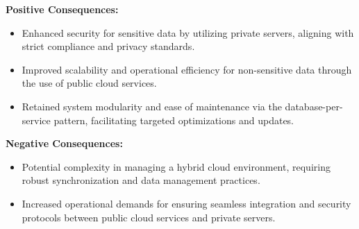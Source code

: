 \textbf{Positive Consequences:}
\begin{itemize}
    \item Enhanced security for sensitive data by utilizing private servers, aligning with strict compliance and privacy standards.
    \item Improved scalability and operational efficiency for non-sensitive data through the use of public cloud services.
    \item Retained system modularity and ease of maintenance via the database-per-service pattern, facilitating targeted optimizations and updates.
\end{itemize}

\textbf{Negative Consequences:}
\begin{itemize}
    \item Potential complexity in managing a hybrid cloud environment, requiring robust synchronization and data management practices.
    \item Increased operational demands for ensuring seamless integration and security protocols between public cloud services and private servers.
\end{itemize}